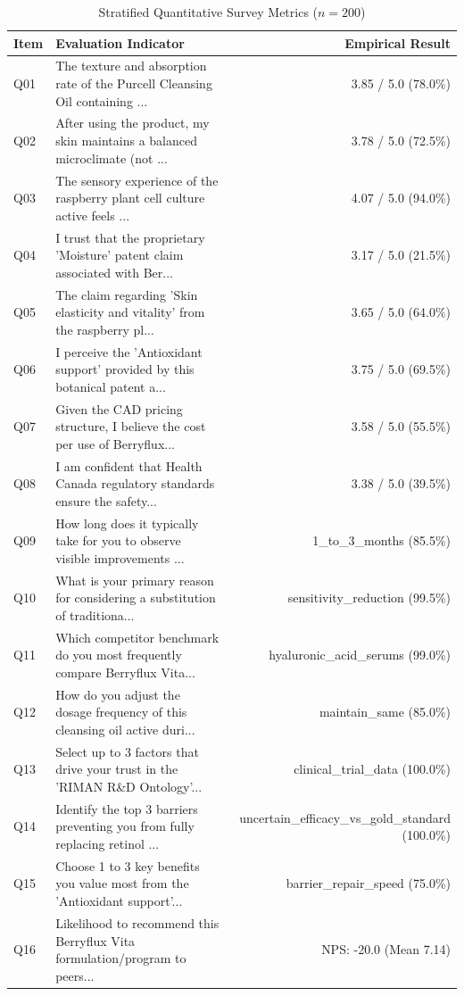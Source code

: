 \documentclass[10pt,twocolumn,a4paper]{article}
\begin{document}
\begin{table}[t]
\centering
\caption{Stratified Quantitative Survey Metrics ($n = 200$)}
\label{tab:metrics}
\small
\begin{tabularx}{\textwidth}{l X r}
\toprule
\textbf{Item} & \textbf{Evaluation Indicator} & \textbf{Empirical Result} \\
\midrule
Q01 & The texture and absorption rate of the Purcell Cleansing Oil containing ... & 3.85 / 5.0 (78.0\%) \\
Q02 & After using the product, my skin maintains a balanced microclimate (not ... & 3.78 / 5.0 (72.5\%) \\
Q03 & The sensory experience of the raspberry plant cell culture active feels ... & 4.07 / 5.0 (94.0\%) \\
Q04 & I trust that the proprietary 'Moisture' patent claim associated with Ber... & 3.17 / 5.0 (21.5\%) \\
Q05 & The claim regarding 'Skin elasticity and vitality' from the raspberry pl... & 3.65 / 5.0 (64.0\%) \\
Q06 & I perceive the 'Antioxidant support' provided by this botanical patent a... & 3.75 / 5.0 (69.5\%) \\
Q07 & Given the CAD pricing structure, I believe the cost per use of Berryflux... & 3.58 / 5.0 (55.5\%) \\
Q08 & I am confident that Health Canada regulatory standards ensure the safety... & 3.38 / 5.0 (39.5\%) \\
Q09 & How long does it typically take for you to observe visible improvements ... & 1\_to\_3\_months (85.5\%) \\
Q10 & What is your primary reason for considering a substitution of traditiona... & sensitivity\_reduction (99.5\%) \\
Q11 & Which competitor benchmark do you most frequently compare Berryflux Vita... & hyaluronic\_acid\_serums (99.0\%) \\
Q12 & How do you adjust the dosage frequency of this cleansing oil active duri... & maintain\_same (85.0\%) \\
Q13 & Select up to 3 factors that drive your trust in the 'RIMAN R\&D Ontology'... & clinical\_trial\_data (100.0\%) \\
Q14 & Identify the top 3 barriers preventing you from fully replacing retinol ... & uncertain\_efficacy\_vs\_gold\_standard (100.0\%) \\
Q15 & Choose 1 to 3 key benefits you value most from the 'Antioxidant support'... & barrier\_repair\_speed (75.0\%) \\
Q16 & Likelihood to recommend this Berryflux Vita formulation/program to peers... & NPS: -20.0 (Mean 7.14) \\
\bottomrule
\end{tabularx}
\end{table}
\end{document}
